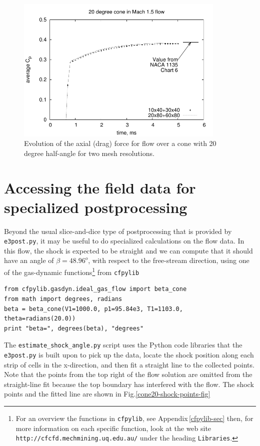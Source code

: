 \begin{figure}[htbp]
\begin{center}
\includegraphics[width=10cm]{../2D/cone20-simple/cone20_cp.pdf}
\end{center}
\caption{Evolution of the axial (drag) force
         for flow over a cone with 20 degree half-angle
	 for two mesh resolutions.}
\label{cone20-axial-force-fig}
\end{figure}

\clearpage
\section{Accessing the field data for specialized postprocessing}
%
Beyond the usual slice-and-dice type of postprocessing that is provided by \verb!e3post.py!, 
it may be useful to do specialized calculations on the flow data.
In this flow, the shock is expected to be straight and we can compute
that it should have an angle of $\beta = 48.96^o$, with respect to the free-stream direction,
using one of the gas-dynamic functions\footnote{For an overview the functions in \texttt{cfpylib}, 
see Appendix\,\ref{cfpylib-sec} then, for more information on each specific function,
look at the web site \texttt{http://cfcfd.mechmining.uq.edu.au/} under the heading \texttt{Libraries}.} 
from \verb!cfpylib!
\begin{verbatim}
from cfpylib.gasdyn.ideal_gas_flow import beta_cone
from math import degrees, radians
beta = beta_cone(V1=1000.0, p1=95.84e3, T1=1103.0, theta=radians(20.0))
print "beta=", degrees(beta), "degrees"
\end{verbatim}

The \texttt{estimate\_shock\_angle.py} script uses the Python code libraries 
that the \texttt{e3post.py} is built upon to pick up the data, 
locate the shock position along each strip of cells in the x-direction,
and then fit a straight line to the collected points.
Note that the points from the top right of the flow solution are omitted from the straight-line fit
because the top boundary has interfered with the flow.
The shock points and the fitted line are shown in Fig.\ref{cone20-shock-points-fig} 

